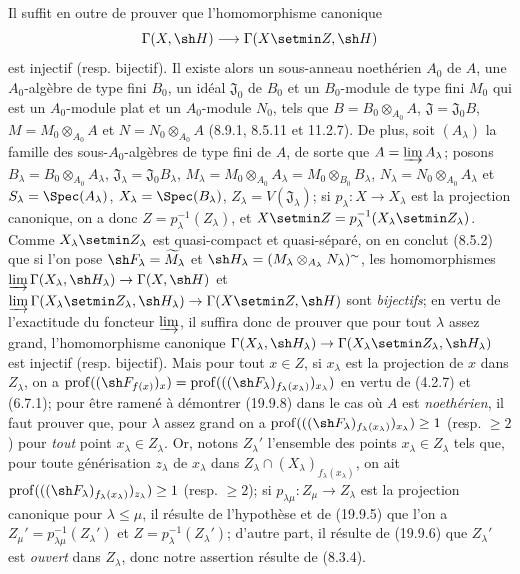 Il suffit en outre de prouver que l'homomorphisme canonique
\[
  \Gamma(X,\sh H)\longrightarrow\Gamma(X\setmin Z,\sh H)
\]
est injectif (resp. bijectif). Il existe alors un sous-anneau noethérien $A_0$ de $A$, une $A_0$-algèbre de type fini $B_0$, un idéal $\mathfrak J_0$ de $B_0$ et un $B_0$-module de type fini $M_0$ qui est
un $A_0$-module plat et un $A_0$-module $N_0$, tels que $B=B_0\otimes_{A_0}A$, $\mathfrak J=\mathfrak J_0B$, $M=M_0\otimes_{A_0}A$ et $N=N_0\otimes_{A_0}A$ (8.9.1, 8.5.11 et 11.2.7). De plus, soit $(A_\lambda)$ la famille des sous-$A_0$-algèbres de type fini de $A$, de sorte que $A=\varinjlim A_\lambda$; posons $B_\lambda=B_0\otimes_{A_0}A_\lambda$, $\mathfrak J_\lambda=\mathfrak J_0B_\lambda$, $M_\lambda=M_0\otimes_{A_0}A_\lambda=M_0\otimes_{B_0}B_\lambda$, $N_\lambda=N_0\otimes_{A_0}A_\lambda$ et $S_\lambda=\Spec(A_\lambda)$, $X_\lambda=\Spec(B_\lambda)$, $Z_\lambda=V(\mathfrak J_\lambda)$; si $p_\lambda:X\to X_\lambda$ est la projection canonique, on a donc $Z=p_\lambda^{-1}(Z_\lambda)$, et $X\setmin Z=p_\lambda^{-1}(X_\lambda\setmin Z_\lambda)$. Comme $X_\lambda\setmin Z_\lambda$ est quasi-compact et quasi-séparé, on en conclut (8.5.2) que si l'on pose $\sh F_\lambda=\widetilde{M}_\lambda$ et $\sh H_\lambda=(M_\lambda\otimes_{A_\lambda}N_\lambda)^\sim$, les homomorphismes $\varinjlim\Gamma(X_\lambda,\sh H_\lambda)\to\Gamma(X,\sh H)$ et $\varinjlim\Gamma(X_\lambda\setmin Z_\lambda,\sh H_\lambda)\to\Gamma(X\setmin Z,\sh H)$
sont \emph{bijectifs}; en vertu de l'exactitude du foncteur $\varinjlim$, il suffira donc de prouver que pour tout $\lambda$ assez grand, l'homomorphisme canonique $\Gamma(X_\lambda,\sh H_\lambda)\to\Gamma(X_\lambda\setmin Z_\lambda,\sh H_\lambda)$ est injectif (resp. bijectif). Mais pour tout $x\in Z$, si $x_\lambda$ est la projection de $x$ dans $Z_\lambda$, on a $\operatorname{prof}((\sh F_{f(x)})_x)=\operatorname{prof}(((\sh F_\lambda)_{f_\lambda(x_\lambda)})_{x_\lambda})$ en vertu de (4.2.7) et (6.7.1); pour être ramené à démontrer (19.9.8) dans le cas où $A$ est \emph{noethérien}, il faut prouver que, pour $\lambda$ assez grand on a $\operatorname{prof}(((\sh F_\lambda)_{f_\lambda(x_\lambda)})_{x_\lambda})\geq1$ (resp. $\geq2$) pour \emph{tout} point $x_\lambda\in Z_\lambda$. Or, notons $Z_\lambda'$ l'ensemble des points $x_\lambda\in Z_\lambda$ tels que, pour toute générisation $z_\lambda$ de $x_\lambda$ dans $Z_\lambda\cap(X_\lambda)_{f_\lambda(x_\lambda)}$, on ait $\operatorname{prof}(((\sh F_\lambda)_{f_\lambda(x_\lambda)})_{z_\lambda})\geq1$ (resp. $\geq2$); si $p_{\lambda\mu}:Z_\mu\to Z_\lambda$ est la projection canonique pour $\lambda\leq\mu$, il résulte de l'hypothèse et de (19.9.5) que l'on a $Z_\mu'=p_{\lambda\mu}^{-1}(Z_\lambda')$ et $Z=p_\lambda^{-1}(Z_\lambda')$; d'autre part, il résulte de (19.9.6) que $Z_\lambda'$ est \emph{ouvert} dans $Z_\lambda$, donc notre assertion résulte de (8.3.4).

